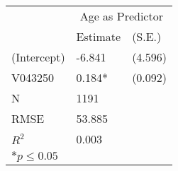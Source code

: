 \begin{Schunk}
\begin{Soutput}
\begin{tabular}{*{3}{l}}
 \hline
                &\multicolumn{2}{c}{Age as Predictor}   \\
                &Estimate &(S.E.) \\
 \hline
 \hline
  (Intercept)    & -6.841  &   (4.596) \\
  V043250        &  0.184*  &   (0.092) \\
 \hline 
 N                &1191      &       \\
 RMSE            &53.885        & \\
 $R^2$           &0.003        & \\
 \hline
 \hline
 
 \multicolumn{2}{l}{${*}  p \le 0.05$   }\\
 \end{tabular}
\end{Soutput}
\end{Schunk}
